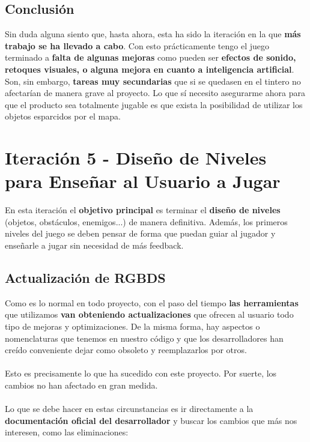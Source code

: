 \subsection{Conclusión}

Sin duda alguna siento que, hasta ahora, esta ha sido la iteración en la que \textbf{más trabajo se ha llevado a cabo}. Con esto prácticamente tengo el juego terminado a \textbf{falta de algunas mejoras} como pueden ser \textbf{efectos de sonido, retoques visuales, o alguna mejora en cuanto a inteligencia artificial}. Son, sin embargo, \textbf{tareas muy secundarias} que si se quedasen en el tintero no afectarían de manera grave al proyecto. Lo que sí necesito asegurarme ahora para que el producto sea totalmente jugable es que exista la posibilidad de utilizar los objetos esparcidos por el mapa.

\clearpage

\section{Iteración 5 - Diseño de Niveles para Enseñar al Usuario a Jugar}

En esta iteración el \textbf{objetivo principal} es terminar el \textbf{diseño de niveles} (objetos, obstáculos, enemigos...) de manera definitiva. Además, los primeros niveles del juego se deben pensar de forma que puedan guiar al jugador y enseñarle a jugar sin necesidad de más feedback.

\subsection{Actualización de RGBDS}

Como es lo normal en todo proyecto, con el paso del tiempo \textbf{las herramientas} que utilizamos \textbf{van obteniendo actualizaciones} que ofrecen al usuario todo tipo de mejoras y optimizaciones. De la misma forma, hay aspectos o nomenclaturas que tenemos en nuestro código y que los desarrolladores han creído conveniente dejar como obsoleto y reemplazarlos por otros.
\\ \\
Esto es precisamente lo que ha sucedido con este proyecto. Por suerte, los cambios no han afectado en gran medida.
\\ \\
Lo que se debe hacer en estas circunstancias es ir directamente a la \textbf{documentación oficial del desarrollador} y buscar los cambios que más nos interesen, como las eliminaciones:

